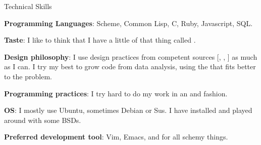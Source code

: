 \begin{rubric}{Technical Skills}{ 

    \entry* \textbf{Programming Languages}: Scheme, Common Lisp, C,
    Ruby, Javascript, SQL.

    \entry* \textbf{Taste}: I like to think that I have a little of that thing
    called .

    \entry* \textbf{Design philosophy}: I use design practices from
    competent sources
    [,
     ,
     ]
    as much as I can. I try my best to grow code from data analysis,
    using the
    that fits better to the problem.

    \entry* \textbf{Programming practices}: I try hard to do my work in an
    and
    fashion.

    \entry* \textbf{OS}: I mostly use Ubuntu, sometimes Debian or
    Sus. I have installed and played around with some BSDs.

    \entry* \textbf{Preferred development tool}: Vim, Emacs, and
    for all schemy things. 

}\end{rubric}
